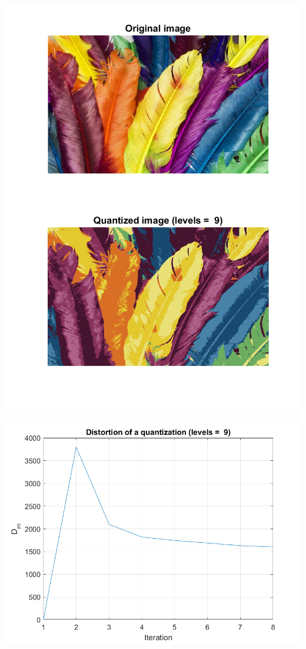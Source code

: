 \documentclass[a4paper]{iacas}
\begin{document}
\vskip 0.1in
\begin{minipage}{1\textwidth}
\centering
	\includegraphics[scale=0.9]{../imgs/imgs_q4/q4_quantized_levels_9_init_2.png}
\end{minipage}
\vskip 0.1in

\vskip 0.1in
\begin{minipage}{1\textwidth}
\centering
	\includegraphics[scale=0.9]{../imgs/imgs_q4/q4_distortion_levels_9_init_2.png}
\end{minipage}
\vskip 0.1in
\end{document}
